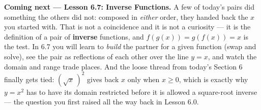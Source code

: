 \documentclass[10pt]{article}
\begin{document}
\begin{spiralbox}
\textbf{Coming next --- Lesson 6.7: Inverse Functions.} A few of today's pairs did something the
others did not: composed in \emph{either} order, they handed back the $x$ you started with. That is
not a coincidence and it is not a curiosity --- it is the definition of a pair of \textbf{inverse}
functions, and $f(g(x))=g(f(x))=x$ is the test. In 6.7 you will learn to \emph{build} the partner
for a given function (swap and solve), see the pair as reflections of each other over the line
$y=x$, and watch the domain and range trade places. And the loose thread from today's Section 6
finally gets tied: $\left(\sqrt{x}\,\right)^{2}$ gives back $x$ only when $x\ge0$, which is exactly
why $y=x^{2}$ has to have its domain restricted before it is allowed a square-root inverse --- the
question you first raised all the way back in Lesson 6.0.
\end{spiralbox}
\end{document}
